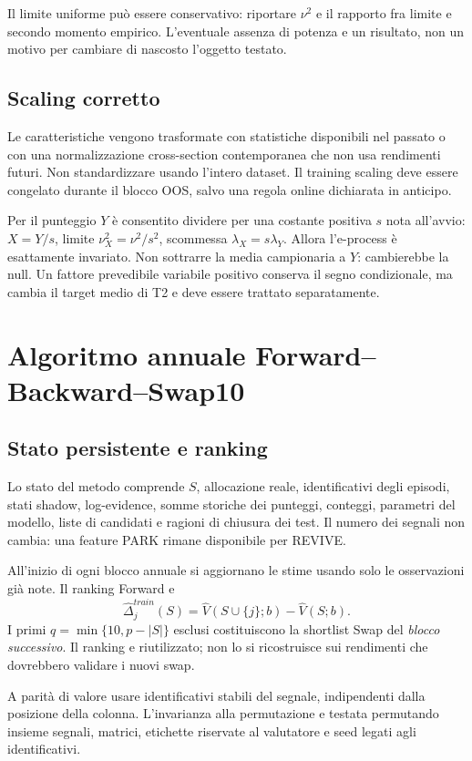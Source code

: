 \documentclass[11pt,a4paper]{article}
\theoremstyle{definition}\newtheorem{definition}[theorem]{Definizione}
\theoremstyle{remark}\newtheorem{remark}[theorem]{Osservazione}
\begin{document}
Il limite uniforme può essere conservativo: riportare $\nu^2$ e il rapporto fra limite e secondo momento empirico. L'eventuale assenza di potenza e un risultato, non un motivo per cambiare di nascosto l'oggetto testato.

\subsection{Scaling corretto}
Le caratteristiche vengono trasformate con statistiche disponibili nel passato o con una normalizzazione cross-section contemporanea che non usa rendimenti futuri. Non standardizzare usando l'intero dataset. Il training scaling deve essere congelato durante il blocco OOS, salvo una regola online dichiarata in anticipo.

Per il punteggio $Y$ è consentito dividere per una costante positiva $s$ nota all'avvio: $X=Y/s$, limite $\nu_X^2=\nu^2/s^2$, scommessa $\lambda_X=s\lambda_Y$. Allora l'e-process è esattamente invariato. Non sottrarre la media campionaria a $Y$: cambierebbe la null. Un fattore prevedibile variabile positivo conserva il segno condizionale, ma cambia il target medio di T2 e deve essere trattato separatamente.

\section{Algoritmo annuale Forward--Backward--Swap10}
\label{sec:algorithm}
\subsection{Stato persistente e ranking}
Lo stato del metodo comprende $S$, allocazione reale, identificativi degli episodi, stati shadow, log-evidence, somme storiche dei punteggi, conteggi, parametri del modello, liste di candidati e ragioni di chiusura dei test. Il numero dei segnali non cambia: una feature PARK rimane disponibile per REVIVE.

All'inizio di ogni blocco annuale si aggiornano le stime usando solo le osservazioni già note. Il ranking Forward e
\begin{equation}
 \widehat\Delta_j^{train}(S)=\widehat V(S\cup\{j\};b)-\widehat V(S;b).
\end{equation}
I primi $q=\min\{10,p-|S|\}$ esclusi costituiscono la shortlist Swap del \emph{blocco successivo}. Il ranking e riutilizzato; non lo si ricostruisce sui rendimenti che dovrebbero validare i nuovi swap.

A parità di valore usare identificativi stabili del segnale, indipendenti dalla posizione della colonna. L'invarianza alla permutazione e testata permutando insieme segnali, matrici, etichette riservate al valutatore e seed legati agli identificativi.
\end{document}
